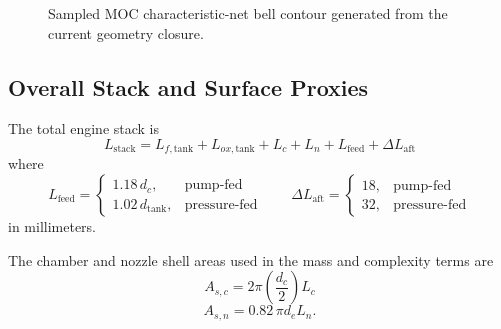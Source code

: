 \documentclass[11pt]{article}
\begin{document}
\begin{figure}[H]
\centering
{}
\caption{Sampled MOC characteristic-net bell contour generated from the current geometry closure.}
\end{figure}

\subsection{Overall Stack and Surface Proxies}
The total engine stack is
\begin{equation}
L_{\text{stack}}
=
L_{f,\text{tank}}
+L_{ox,\text{tank}}
+L_c
+L_n
+L_{\text{feed}}
+\Delta L_{\text{aft}}
\label{eq:stack-length}
\end{equation}
where
\begin{equation}
L_{\text{feed}}=
\begin{cases}
1.18\,d_c, & \text{pump-fed}\\
1.02\,d_{\text{tank}}, & \text{pressure-fed}
\end{cases}
\qquad
\Delta L_{\text{aft}}=
\begin{cases}
18, & \text{pump-fed}\\
32, & \text{pressure-fed}
\end{cases}
\label{eq:feed-bay}
\end{equation}
in millimeters.

The chamber and nozzle shell areas used in the mass and complexity terms are
\begin{equation}
A_{s,c}=2\pi \left(\frac{d_c}{2}\right)L_c
\label{eq:chamber-area}
\end{equation}
\begin{equation}
A_{s,n}=0.82\,\pi d_e L_n.
\label{eq:nozzle-shell-area}
\end{equation}
\end{document}
